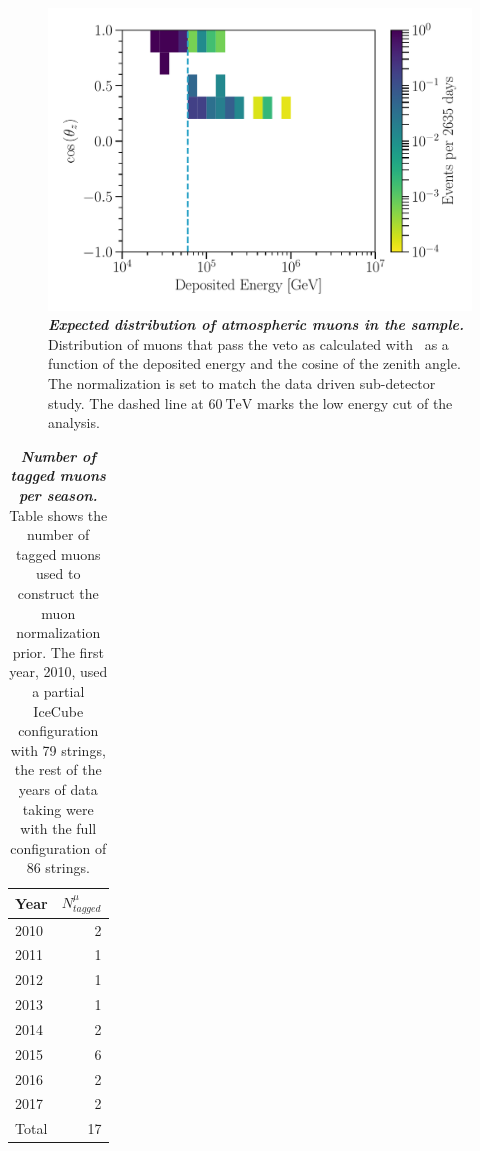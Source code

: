 \begin{figure}
	\centering
	\includegraphics[width=\linewidth]{figures/hese_paper/diffuse_hist_all_muons}
	\internallinenumbers
	\caption{\textbf{\textit{Expected distribution of atmospheric muons in the sample.}} Distribution of muons that pass the veto as calculated with \MUONGUN~as a function of the deposited energy and the cosine of the zenith angle.
		The normalization is set to match the data driven sub-detector study.
		The dashed line at $\SI{60}\TeV$ marks the low energy cut of the analysis.}\label{fig:muons}
\end{figure}

\begin{table}
	\centering
	\begin{tabular}{l r}
		\toprule
		Year & $N^\mu_{tagged}$ \\
		\midrule
		2010 & 2 \\
		2011 & 1 \\
		2012 & 1 \\
		2013 & 1 \\
		2014 & 2 \\
		2015 & 6 \\
		2016 & 2 \\
		2017 & 2 \\
		\midrule
		Total & 17 \\
		\bottomrule
	\end{tabular}
	\internallinenumbers
	\caption{\textbf{\textit{Number of tagged muons per season.}}
		Table shows the number of tagged muons used to construct the muon normalization prior.
		The first year, 2010, used a partial IceCube configuration with 79 strings, the rest of the years of data taking were with the full configuration of 86 strings.}\label{tbl:tag_muons}
\end{table}

